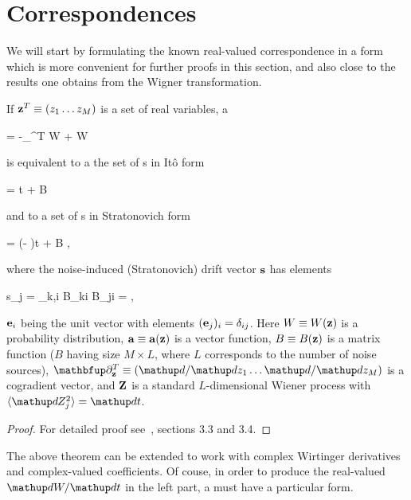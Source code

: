 \section{Correspondences}

We will start by formulating the known real-valued correspondence in a form which is more convenient for further proofs in this section, and also close to the results one obtains from the Wigner transformation.

\begin{lemma}
\label{lmm:fpe-sde:corr:fpe-sde-real}
	If $\mathbf{z}^T \equiv (z_1 \ldots z_M)$ is a set of real variables, a 
	\begin{eqn*}
		= -\vcwd_{\zvec}^T \cdot \avec W
		+   W
	\end{eqn*}
	is equivalent to a the set of s in It\^{o} form
	\begin{eqn*}
		\upd\zvec = \avec \upd t + B \upd\Zvec
	\end{eqn*}
	and to a set of s in Stratonovich form
	\begin{eqn*}
		\upd\zvec = (\avec - \svec)\upd t + B \upd\Zvec,
	\end{eqn*}
	where the noise-induced (Stratonovich) drift vector $\mathbf{s}$ has elements
	\begin{eqn*}
		s_j
		=  \sum_{k,i} B_{ki}  B_{ji}
		=  \Trace{B^T \vcwd_{\zvec} \evec_j^T B},
	\end{eqn*}
	$\mathbf{e}_i$ being the unit vector with elements $(\mathbf{e}_j)_i = \delta_{ij}$.
	Here $W \equiv W(\mathbf{z})$ is a probability distribution, $\mathbf{a} \equiv \mathbf{a}(\mathbf{z})$ is a vector function, $B \equiv B(\mathbf{z})$ is a matrix function ($B$ having size $M \times L$, where $L$ corresponds to the number of noise sources), $\vcwd_{\zvec}^T \equiv (\upd/\upd z_1 \ldots \upd/\upd z_M)$ is a cogradient vector, and $\mathbf{Z}$ is a standard $L$-dimensional Wiener process with $\langle \upd Z_j^2 \rangle = \upd t$.
\end{lemma}
\begin{proof}
For detailed proof see~\cite{Risken1996}, sections 3.3 and 3.4.
\end{proof}

The above theorem can be extended to work with complex Wirtinger derivatives and complex-valued coefficients.
Of couse, in order to produce the real-valued $\upd W/\upd t$ in the left part, a  must have a particular form.

